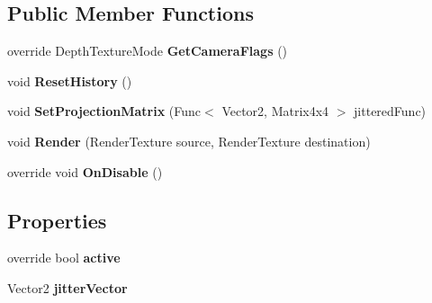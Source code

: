 \subsection*{Public Member Functions}
\begin{DoxyCompactItemize}
\item 
\mbox{\label{class_unity_engine_1_1_post_processing_1_1_taa_component_acdb6cc8b86f8792042c7d57579db1e4a}} 
override Depth\+Texture\+Mode {\bfseries Get\+Camera\+Flags} ()
\item 
\mbox{\label{class_unity_engine_1_1_post_processing_1_1_taa_component_a338933e1af86c58cfcd016994651b5d8}} 
void {\bfseries Reset\+History} ()
\item 
\mbox{\label{class_unity_engine_1_1_post_processing_1_1_taa_component_ac388a6ff1c2b47604772d4a18e6e8d24}} 
void {\bfseries Set\+Projection\+Matrix} (Func$<$ Vector2, Matrix4x4 $>$ jittered\+Func)
\item 
\mbox{\label{class_unity_engine_1_1_post_processing_1_1_taa_component_a84a55cff0051067183e6e2daa8cfe317}} 
void {\bfseries Render} (Render\+Texture source, Render\+Texture destination)
\item 
\mbox{\label{class_unity_engine_1_1_post_processing_1_1_taa_component_aae1a9b2df8e23593b75e7eb2c9cc6b4c}} 
override void {\bfseries On\+Disable} ()
\end{DoxyCompactItemize}
\subsection*{Properties}
\begin{DoxyCompactItemize}
\item 
\mbox{\label{class_unity_engine_1_1_post_processing_1_1_taa_component_aadb855573680151dae4900d12af520b2}} 
override bool {\bfseries active}
\item 
\mbox{\label{class_unity_engine_1_1_post_processing_1_1_taa_component_ad7a44ec209bac50e7f42e10784462019}} 
Vector2 {\bfseries jitter\+Vector}
\end{DoxyCompactItemize}
